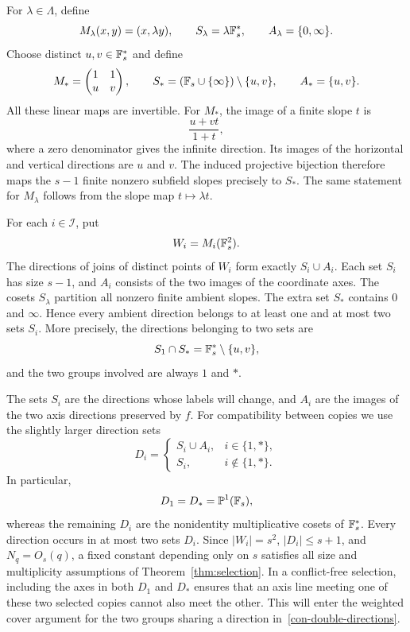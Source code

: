 For \(\lambda\in\Lambda\), define
\[
 M_\lambda(x,y)=(x,\lambda y),
 \qquad S_\lambda=\lambda\mathbb F_s^*,
 \qquad A_\lambda=\{0,\infty\}.
\]
Choose distinct \(u,v\in\mathbb F_s^*\) and define
\[
 M_*=
 \begin{pmatrix}1&1\\u&v\end{pmatrix},
 \qquad
 S_*=(\mathbb F_s\cup\{\infty\})\setminus\{u,v\},
 \qquad A_*=\{u,v\}.
\]
All these linear maps are invertible.  For \(M_*\), the image of
a finite slope \(t\) is
\[
 \frac{u+vt}{1+t},
\]
where a zero denominator gives the infinite direction.  Its images
of the horizontal and vertical directions are \(u\) and \(v\).
The induced projective bijection therefore maps the \(s-1\)
finite nonzero subfield slopes precisely to \(S_*\).  The same
statement for \(M_\lambda\) follows from the slope map
\(t\mapsto\lambda t\).

For each \(i\in\mathcal I\), put
\[
 W_i=M_i(\mathbb F_s^2).
\]
The directions of joins of distinct points of \(W_i\) form exactly
\(S_i\cup A_i\).  Each set \(S_i\) has size \(s-1\), and
\(A_i\) consists of the two images of the coordinate axes.  The
cosets \(S_\lambda\) partition all nonzero finite ambient slopes.
The extra set \(S_*\) contains \(0\) and \(\infty\).  Hence
every ambient direction belongs to at least one and at most two
sets \(S_i\).  More precisely, the directions belonging to two
sets are
\begin{equation}
\label{con-double-directions}
 S_1\cap S_* = \mathbb F_s^*\setminus\{u,v\},
\end{equation}
and the two groups involved are always \(1\) and \(*\).

The sets \(S_i\) are the directions whose labels will change, and
\(A_i\) are the images of the two axis directions preserved by \(f\).
For compatibility between copies we use the
slightly larger direction sets
\[
 D_i=
 \begin{cases}
 S_i\cup A_i,&i\in\{1,*\},\\
 S_i,&i\notin\{1,*\}.
 \end{cases}
\]
In particular,
\begin{equation}
\label{con-conflict-directions}
 D_1=D_*=\mathbb P^1(\mathbb F_s),
\end{equation}
whereas the remaining \(D_i\) are the nonidentity multiplicative
cosets of \(\mathbb F_s^*\).  Every direction occurs in at most two
sets \(D_i\).  Since \(|W_i|=s^2\), \(|D_i|\le s+1\), and
\(N_q=O_s(q)\), a fixed constant depending only on \(s\)
satisfies all size and multiplicity assumptions of
Theorem~\ref{thm:selection}.  In a conflict-free selection, including
the axes in both \(D_1\) and \(D_*\) ensures that an axis line
meeting one of these two selected copies cannot also meet the other.
This will enter the weighted cover
argument for the two groups sharing a direction
in~\eqref{con-double-directions}.


